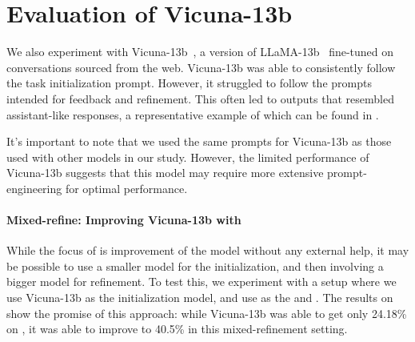 \section{Evaluation of Vicuna-13b}
\label{sec:vicunaresults}

We also experiment with Vicuna-13b~\citep{chiang2023vicuna}, a version of LLaMA-13b~\citep{touvron2023llama} fine-tuned on conversations sourced from the web.
Vicuna-13b was able to consistently follow the task initialization prompt. However, it struggled to follow the prompts intended for feedback and refinement. 
This often led to outputs that resembled assistant-like responses, a representative example of which can be found in .



It's important to note that we used the same prompts for Vicuna-13b as those used with other models in our study. However, the limited performance of Vicuna-13b suggests that this model may require more extensive prompt-engineering for optimal performance.

\paragraph{Mixed-refine: Improving Vicuna-13b with \chatgpt} While the focus of \ours is improvement of the model without any external help, it may be possible to use a smaller model for the initialization, and then involving a bigger model for refinement. To test this, we experiment with a setup where we use Vicuna-13b as the initialization model, and use \chatgpt as the \fbmod and \itermod.
The results on \gsm show the promise of this approach: while Vicuna-13b was able to get only 24.18\% on \gsm, it was able to improve to 40.5\% in this mixed-refinement setting.

